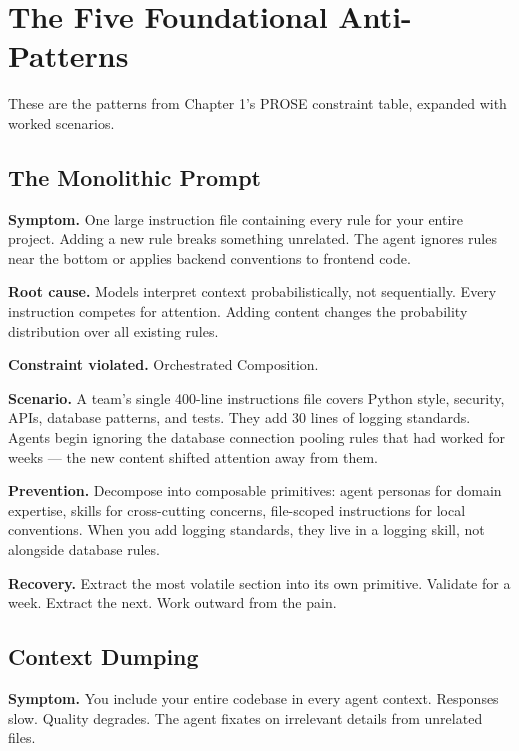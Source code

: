 \documentclass[
  a4paper,
  DIV=11,
  numbers=noendperiod]{scrreprt}
\begin{document}
\section{The Five Foundational
Anti-Patterns}\label{the-five-foundational-anti-patterns}

These are the patterns from Chapter 1's PROSE constraint table, expanded
with worked scenarios.

\subsection{The Monolithic Prompt}\label{the-monolithic-prompt}

\textbf{Symptom.} One large instruction file containing every rule for
your entire project. Adding a new rule breaks something unrelated. The
agent ignores rules near the bottom or applies backend conventions to
frontend code.

\textbf{Root cause.} Models interpret context probabilistically, not
sequentially. Every instruction competes for attention. Adding content
changes the probability distribution over all existing rules.

\textbf{Constraint violated.} Orchestrated Composition.

\textbf{Scenario.} A team's single 400-line instructions file covers
Python style, security, APIs, database patterns, and tests. They add 30
lines of logging standards. Agents begin ignoring the database
connection pooling rules that had worked for weeks --- the new content
shifted attention away from them.

\textbf{Prevention.} Decompose into composable primitives: agent
personas for domain expertise, skills for cross-cutting concerns,
file-scoped instructions for local conventions. When you add logging
standards, they live in a logging skill, not alongside database rules.

\textbf{Recovery.} Extract the most volatile section into its own
primitive. Validate for a week. Extract the next. Work outward from the
pain.

\subsection{Context Dumping}\label{context-dumping}

\textbf{Symptom.} You include your entire codebase in every agent
context. Responses slow. Quality degrades. The agent fixates on
irrelevant details from unrelated files.
\end{document}
